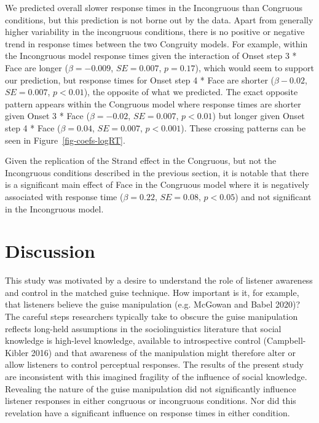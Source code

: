 \documentclass[
  letterpaper,
  DIV=11,
  numbers=noendperiod]{scrartcl}
\begin{document}
We predicted overall slower response times in the Incongruous than
Congruous conditions, but this prediction is not borne out by the data.
Apart from generally higher variability in the incongruous conditions,
there is no positive or negative trend in response times between the two
Congruity models. For example, within the Incongruous model response
times given the interaction of Onset step 3 * Face are longer
(\(β=-0.009\), \(SE=0.007\), \(p = 0.17\)), which would seem to support
our prediction, but response times for Onset step 4 * Face are shorter
(\(β-0.02\), \(SE=0.007\), \(p < 0.01\)), the opposite of what we
predicted. The exact opposite pattern appears within the Congruous model
where response times are shorter given Onset 3 * Face (\(β=-0.02\),
\(SE=0.007\), \(p < 0.01\)) but longer given Onset step 4 * Face
(\(β=0.04\), \(SE=0.007\), \(p < 0.001\)). These crossing patterns can
be seen in Figure~\ref{fig-coefs-logRT}.

Given the replication of the Strand effect in the Congruous, but not the
Incongruous conditions described in the previous section, it is notable
that there is a significant main effect of Face in the Congruous model
where it is negatively associated with response time (\(β=0.22\),
\(SE=0.08\), \(p < 0.05\)) and not significant in the Incongruous model.

\section{Discussion}\label{discussion}

This study was motivated by a desire to understand the role of listener
awareness and control in the matched guise technique. How important is
it, for example, that listeners believe the guise manipulation (e.g.
McGowan and Babel 2020)? The careful steps researchers typically take to
obscure the guise manipulation reflects long-held assumptions in the
sociolinguistics literature that social knowledge is high-level
knowledge, available to introspective control (Campbell-Kibler 2016) and
that awareness of the manipulation might therefore alter or allow
listeners to control perceptual responses. The results of the present
study are inconsistent with this imagined fragility of the influence of
social knowledge. Revealing the nature of the guise manipulation did not
significantly influence listener responses in either congruous or
incongruous conditions. Nor did this revelation have a significant
influence on response times in either condition.
\end{document}
